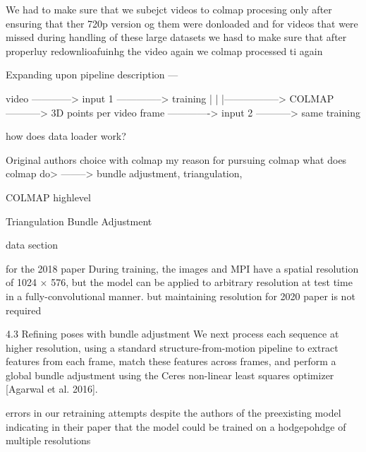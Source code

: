 We had to make sure that we subejct videos to colmap procesing only after ensuring that ther 720p version og them were donloaded and for videos that were missed during handling of these large datasets we hasd to make sure that after properluy redownlioafuinhg the video again we colmap processed ti again 


Expanding upon pipeline description ---

video ------------> input 1 --------------> training
|
|
|-----------------> COLMAP -----------> 3D points per video frame -------------> input 2 -----------> same training

how does data loader work?

Original authors choice with colmap 
my reason for pursuing colmap
what does colmap do> --------> bundle adjustment, triangulation, 

COLMAP highlevel

Triangulation
Bundle Adjustment

data section

for the 2018 paper
During training, the images and
MPI have a spatial resolution of 1024 × 576, but the model can be
applied to arbitrary resolution at test time in a fully-convolutional
manner.
but maintaining resolution for 2020 paper is not required 

4.3 Refining poses with bundle adjustment
We next process each sequence at higher resolution, using a standard
structure-from-motion pipeline to extract features from each
frame, match these features across frames, and perform a global
bundle adjustment using the Ceres non-linear least squares optimizer
[Agarwal et al. 2016].

errors in our retraining attempts despite the authors of the preexisting model indicating in their paper that the model could be trained on a hodgepohdge of multiple resolutions   














